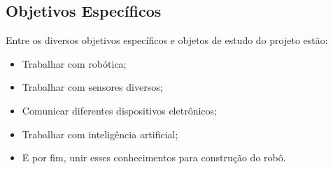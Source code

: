 \subsection{Objetivos Específicos}

Entre os diversos objetivos específicos e objetos de estudo do projeto estão:

\begin{itemize}

    \item {Trabalhar com robótica;}

    \item {Trabalhar com sensores diversos;}

    \item {Comunicar diferentes dispositivos eletrônicos;}

    \item {Trabalhar com inteligência artificial;}

    \item {E por fim, unir esses conhecimentos para construção do robô.}


\end{itemize}
